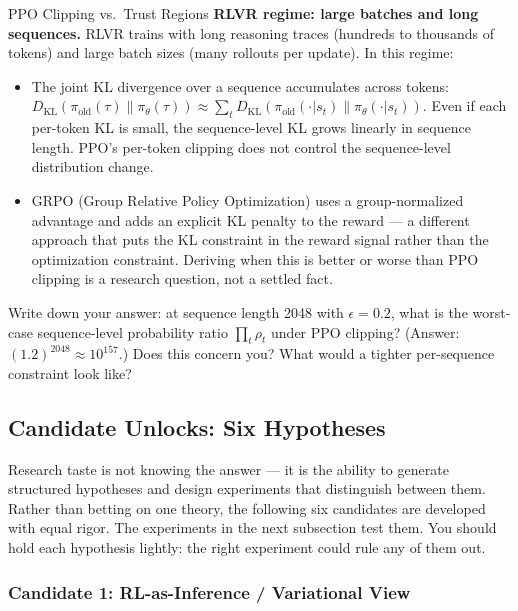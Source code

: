 \begin{thinkfirst}{PPO Clipping vs.\ Trust Regions}
\textbf{RLVR regime: large batches and long sequences.} RLVR trains with long reasoning traces (hundreds to thousands of tokens) and large batch sizes (many rollouts per update). In this regime:
\begin{itemize}
  \item The joint KL divergence over a sequence accumulates across tokens: $D_{\mathrm{KL}}(\pi_{\text{old}}(\tau) \| \pi_\theta(\tau)) \approx \sum_t D_{\mathrm{KL}}(\pi_{\text{old}}(\cdot|s_t) \| \pi_\theta(\cdot|s_t))$. Even if each per-token KL is small, the sequence-level KL grows linearly in sequence length. PPO's per-token clipping does not control the sequence-level distribution change.
  \item GRPO (Group Relative Policy Optimization) uses a group-normalized advantage and adds an explicit KL penalty to the reward --- a different approach that puts the KL constraint in the reward signal rather than the optimization constraint. Deriving when this is better or worse than PPO clipping is a research question, not a settled fact.
\end{itemize}

Write down your answer: at sequence length 2048 with $\epsilon = 0.2$, what is the worst-case sequence-level probability ratio $\prod_t \rho_t$ under PPO clipping? (Answer: $(1.2)^{2048} \approx 10^{157}$.) Does this concern you? What would a tighter per-sequence constraint look like?
\end{thinkfirst}

\subsection{Candidate Unlocks: Six Hypotheses}

Research taste is not knowing the answer --- it is the ability to generate structured hypotheses and design experiments that distinguish between them. Rather than betting on one theory, the following six candidates are developed with equal rigor. The experiments in the next subsection test them. You should hold each hypothesis lightly: the right experiment could rule any of them out.

\subsubsection{Candidate 1: RL-as-Inference / Variational View}


